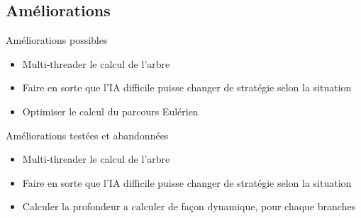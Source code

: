 \documentclass{beamer}
\begin{document}
\subsection{Améliorations}
\begin{frame}{}
\begin{block}{Améliorations possibles}
\begin{itemize}
 \item<1-> Multi-threader le calcul de l’arbre
 \item<2-> Faire en sorte que l’IA difficile puisse changer de stratégie selon la situation
 \item<3-> Optimiser le calcul du parcours Eulérien
\end{itemize}
\end{block}
\begin{block}{Améliorations testées et abandonnées}
\begin{itemize}
 \item<1-> Multi-threader le calcul de l’arbre
 \item<2-> Faire en sorte que l’IA difficile puisse changer de stratégie selon la situation
 \item<3-> Calculer la profondeur a calculer de façon dynamique, pour chaque branches
\end{itemize}
\end{block}
\end{frame}
\end{document}
